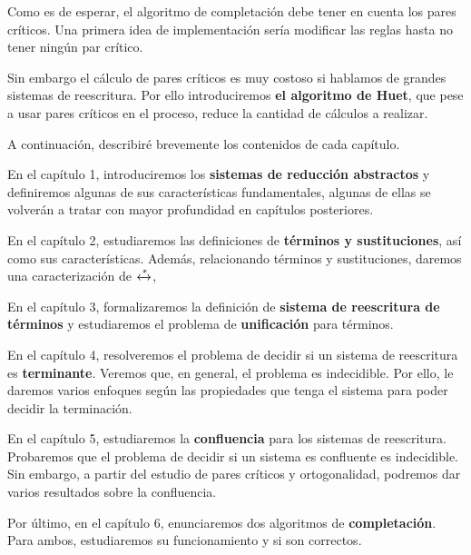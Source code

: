 Como es de esperar, el algoritmo de completación debe tener en cuenta
los pares críticos. Una primera idea de implementación sería modificar
las reglas hasta no tener ningún par crítico.

Sin embargo el cálculo de pares críticos es muy costoso si hablamos de
grandes sistemas de reescritura. Por ello introduciremos \textbf{el algoritmo
de Huet}, que pese a usar pares críticos en el proceso, reduce la
cantidad de cálculos a realizar.

A continuación, describiré brevemente los contenidos de cada capítulo.

En el capítulo 1, introduciremos los \textbf{sistemas de reducción abstractos} y
definiremos algunas de sus características fundamentales, algunas de
ellas se volverán a tratar con mayor profundidad en capítulos
posteriores.

En el capítulo 2, estudiaremos las definiciones de \textbf{términos y
sustituciones}, así como sus características. Además, relacionando
términos y sustituciones, daremos una caracterización de
$\xleftrightarrow{*}$,

En el capítulo 3, formalizaremos la definición de \textbf{sistema de
reescritura de términos} y estudiaremos el problema de \textbf{unificación} para
términos.

En el capítulo 4, resolveremos el problema de decidir si un sistema de
reescritura es \textbf{terminante}. Veremos que, en general, el problema es
indecidible. Por ello, le daremos varios enfoques según las
propiedades que tenga el sistema para poder decidir la terminación.

En el capítulo 5, estudiaremos la \textbf{confluencia} para los sistemas de
reescritura. Probaremos que el problema de decidir si un sistema es
confluente es indecidible. Sin embargo, a partir del estudio de pares
críticos y ortogonalidad, podremos dar varios resultados sobre la
confluencia.

Por último, en el capítulo 6, enunciaremos dos algoritmos de
\textbf{completación}. Para ambos, estudiaremos su funcionamiento y si son
correctos.

